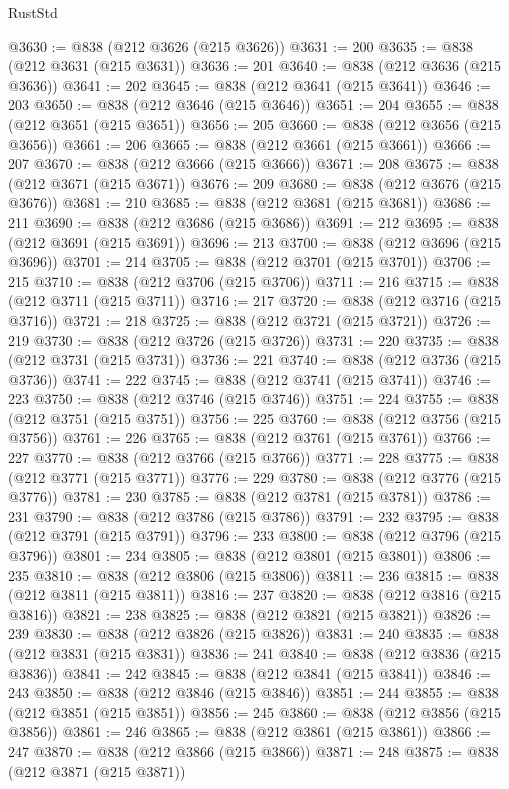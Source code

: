 \begin{lexlean}{RustStd}
\begin{coremodule}
{\begin{coremodule}
{{{{{{{{{{{{{{{{{{{{{{{{{{{{{{{{{{{{{{{{{{{{{{{{{{{{{{{@3630 := @838 (@212 @3626 (@215 @3626))
@3631 := 200
@3635 := @838 (@212 @3631 (@215 @3631))
@3636 := 201
@3640 := @838 (@212 @3636 (@215 @3636))
@3641 := 202
@3645 := @838 (@212 @3641 (@215 @3641))
@3646 := 203
@3650 := @838 (@212 @3646 (@215 @3646))
@3651 := 204
@3655 := @838 (@212 @3651 (@215 @3651))
@3656 := 205
@3660 := @838 (@212 @3656 (@215 @3656))
@3661 := 206
@3665 := @838 (@212 @3661 (@215 @3661))
@3666 := 207
@3670 := @838 (@212 @3666 (@215 @3666))
@3671 := 208
@3675 := @838 (@212 @3671 (@215 @3671))
@3676 := 209
@3680 := @838 (@212 @3676 (@215 @3676))
@3681 := 210
@3685 := @838 (@212 @3681 (@215 @3681))
@3686 := 211
@3690 := @838 (@212 @3686 (@215 @3686))
@3691 := 212
@3695 := @838 (@212 @3691 (@215 @3691))
@3696 := 213
@3700 := @838 (@212 @3696 (@215 @3696))
@3701 := 214
@3705 := @838 (@212 @3701 (@215 @3701))
@3706 := 215
@3710 := @838 (@212 @3706 (@215 @3706))
@3711 := 216
@3715 := @838 (@212 @3711 (@215 @3711))
@3716 := 217
@3720 := @838 (@212 @3716 (@215 @3716))
@3721 := 218
@3725 := @838 (@212 @3721 (@215 @3721))
@3726 := 219
@3730 := @838 (@212 @3726 (@215 @3726))
@3731 := 220
@3735 := @838 (@212 @3731 (@215 @3731))
@3736 := 221
@3740 := @838 (@212 @3736 (@215 @3736))
@3741 := 222
@3745 := @838 (@212 @3741 (@215 @3741))
@3746 := 223
@3750 := @838 (@212 @3746 (@215 @3746))
@3751 := 224
@3755 := @838 (@212 @3751 (@215 @3751))
@3756 := 225
@3760 := @838 (@212 @3756 (@215 @3756))
@3761 := 226
@3765 := @838 (@212 @3761 (@215 @3761))
@3766 := 227
@3770 := @838 (@212 @3766 (@215 @3766))
@3771 := 228
@3775 := @838 (@212 @3771 (@215 @3771))
@3776 := 229
@3780 := @838 (@212 @3776 (@215 @3776))
@3781 := 230
@3785 := @838 (@212 @3781 (@215 @3781))
@3786 := 231
@3790 := @838 (@212 @3786 (@215 @3786))
@3791 := 232
@3795 := @838 (@212 @3791 (@215 @3791))
@3796 := 233
@3800 := @838 (@212 @3796 (@215 @3796))
@3801 := 234
@3805 := @838 (@212 @3801 (@215 @3801))
@3806 := 235
@3810 := @838 (@212 @3806 (@215 @3806))
@3811 := 236
@3815 := @838 (@212 @3811 (@215 @3811))
@3816 := 237
@3820 := @838 (@212 @3816 (@215 @3816))
@3821 := 238
@3825 := @838 (@212 @3821 (@215 @3821))
@3826 := 239
@3830 := @838 (@212 @3826 (@215 @3826))
@3831 := 240
@3835 := @838 (@212 @3831 (@215 @3831))
@3836 := 241
@3840 := @838 (@212 @3836 (@215 @3836))
@3841 := 242
@3845 := @838 (@212 @3841 (@215 @3841))
@3846 := 243
@3850 := @838 (@212 @3846 (@215 @3846))
@3851 := 244
@3855 := @838 (@212 @3851 (@215 @3851))
@3856 := 245
@3860 := @838 (@212 @3856 (@215 @3856))
@3861 := 246
@3865 := @838 (@212 @3861 (@215 @3861))
@3866 := 247
@3870 := @838 (@212 @3866 (@215 @3866))
@3871 := 248
@3875 := @838 (@212 @3871 (@215 @3871))
}}}}}}}}}}}}}}}}}}}}}}}}}}}}}}}}}}}}}}}}}}}}}}}}}}}}}}}
\end{coremodule}}
\end{coremodule}
\end{lexlean}
